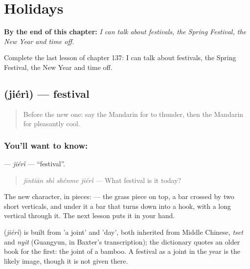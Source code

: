 
\chapter{Holidays}
\label{ch:zh-holidays}

\begin{chapteropening}
\textbf{By the end of this chapter:} \emph{I can talk about festivals, the Spring Festival, the New Year and time off.}

Complete the last lesson of chapter 137: I can talk about festivals, the Spring Festival, the New Year and time off.
\end{chapteropening}

\section[\texorpdfstring{\zh{节日} (jiérì)}{节日 (jiérì)}]{ (jiérì) — festival}

\label{lesson:ZH-C137-jieri}



\begin{quote}
Before the new one: say the Mandarin for to thunder, then the Mandarin for pleasantly cool.
\end{quote}

\subsection*{You'll want to know: }
\textbf{} — \emph{jiérì} — \textquotedblleft{}festival\textquotedblright{}.

\begin{quote}
\textbf{} \emph{jīntiān shì shénme jiérì} — What festival is it today?
\end{quote}

The new character, in pieces:  — the grass piece on top, a bar crossed by two short verticals, and under it a bar that turns down into a hook, with a long vertical through it. The next lesson puts it in your hand.

\begin{cousinweb}
\textbf{} (\emph{jiérì}) is built from  'a joint' and  'day', both inherited from Middle Chinese, \emph{tset} and \emph{nyit} (Guangyun, in Baxter's transcription); the dictionary quotes an older book for the first: the joint of a bamboo. A festival as a joint in the year is the likely image, though it is not given there.
\end{cousinweb}

